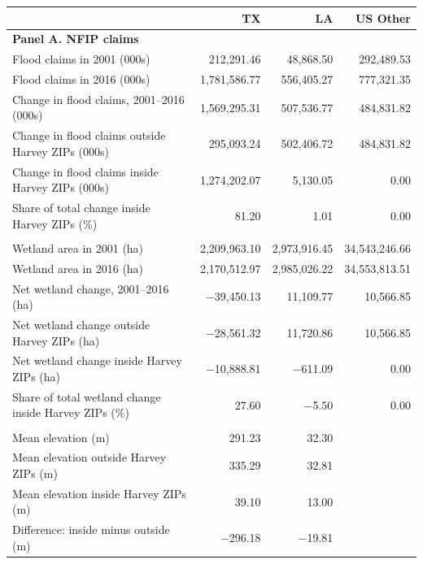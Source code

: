 \begin{tabular}{lrrr}
\hline
\hline
 & TX & LA & US Other \\
\hline
\multicolumn{4}{l}{\textbf{Panel A. NFIP claims}} \\
Flood claims in 2001 (000s) & 212,291.46 & 48,868.50 & 292,489.53 \\
Flood claims in 2016 (000s) & 1,781,586.77 & 556,405.27 & 777,321.35 \\
Change in flood claims, 2001--2016 (000s) & 1,569,295.31 & 507,536.77 & 484,831.82 \\
Change in flood claims outside Harvey ZIPs (000s) & 295,093.24 & 502,406.72 & 484,831.82 \\
Change in flood claims inside Harvey ZIPs (000s) & 1,274,202.07 & 5,130.05 & 0.00 \\
Share of total change inside Harvey ZIPs (\%) & 81.20 & 1.01 & 0.00 \\
\addlinespace
\multicolumn{4}{l}{\textbf{Panel B. Wetlands}} \\
Wetland area in 2001 (ha) & 2,209,963.10 & 2,973,916.45 & 34,543,246.66 \\
Wetland area in 2016 (ha) & 2,170,512.97 & 2,985,026.22 & 34,553,813.51 \\
Net wetland change, 2001--2016 (ha) & $-$39,450.13 & 11,109.77 & 10,566.85 \\
Net wetland change outside Harvey ZIPs (ha) & $-$28,561.32 & 11,720.86 & 10,566.85 \\
Net wetland change inside Harvey ZIPs (ha) & $-$10,888.81 & $-$611.09 & 0.00 \\
Share of total wetland change inside Harvey ZIPs (\%) & 27.60 & $-$5.50 & 0.00 \\
\addlinespace
\multicolumn{4}{l}{\textbf{Panel C. Elevation}} \\
Mean elevation (m) & 291.23 & 32.30 &  \\
Mean elevation outside Harvey ZIPs (m) & 335.29 & 32.81 &  \\
Mean elevation inside Harvey ZIPs (m) & 39.10 & 13.00 &  \\
Difference: inside minus outside (m) & $-$296.18 & $-$19.81 &  \\
\hline
\hline
\end{tabular}
